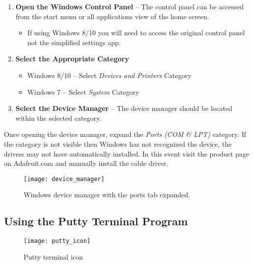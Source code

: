 \documentclass[openany,11pt,fleqn]{book} %
\begin{document}
\begin{enumerate}
    \item \textbf{Open the Windows Control Panel} -- The control panel can be accessed from the start menu or all applications view of the home screen.
        \begin{itemize}
            \item If using Windows 8/10 you will need to access the original control panel not the simplified settings app.
        \end{itemize} 
    \item \textbf{Select the Appropriate Category}
     \begin{itemize}
        \item Windows 8/10 -- Select \textit{Devices and Printers} Category
        \item Windows 7 -- Select \textit{System} Category
    \end{itemize} 
    \item \textbf{Select the Device Manager} -- The device manager should be located within the selected category.
\end{enumerate}

Once opening the device manager, expand the \textit{Ports (COM \& LPT)} category. If the category is not visible then Windows has not recognized the device, the drivers may not have automatically installed. In this event visit the product page on Adafruit.com and manually install the cable driver.  
\begin{figure}[]
    \centering\texttt{[image: device\_manager]}
    \caption{Windows device manager with the ports tab expanded.}
    \label{device_manager}
\end{figure}

\subsection{Using the Putty Terminal Program}


\begin{wrapfigure}[8]{h!R}{0.2\textwidth}
    \centering\texttt{[image: putty\_icon]}
    \caption{Putty terminal icon}
    \label{uvision_logo}
\end{wrapfigure}
\end{document}

